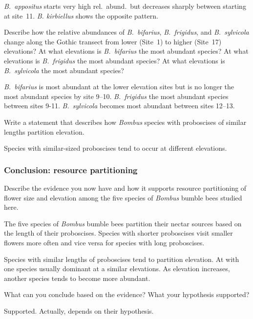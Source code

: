 \documentclass[12pt, hidelinks]{exam}
\newcommand*\AnswerBox[2]{%
    \parbox[t][#1]{0.92\textwidth}{%
    \begin{solution}#2\end{solution}}
    \vspace{\stretch{1}}
}
\newenvironment{AnswerPage}[1]
    {\begin{minipage}[t][#1]{0.92\textwidth}%
    \begin{solution}}
    {\end{solution}\end{minipage}
    \vspace{\stretch{1}}}
\begin{document}
\begin{questions}
\AnswerBox{3\baselineskip}{\textit{B.~appositus} starts very 
high rel.~abund.~but decreases sharply between starting at
site~11. \textit{B. kirbiellus} shows the opposite pattern.}

\question
Describe how the relative abundances of \textit{B.~bifarius},
\textit{B.~frigidus}, and \textit{B.~sylvicola} change along 
the Gothic transect from lower (Site~1) to higher (Site~17) elevations? At what elevations is \textit{B.~bifarius} the
most abundant species? At what elevations is \textit{B.~frigidus} 
the most abundant species? At what elevations is \textit{B.~sylvicola} 
the most abundant species?

\AnswerBox{4\baselineskip}{\textit{B.~bifarius} is most abundant
at the lower elevation sites but is no longer the most abundant 
species by site 9–10. \textit{B.~frigidus} the most abundant species
between sites 9-11. \textit{B.~sylvicola} becomes most abundant 
between sites 12–13.}


\question
Write a statement that describes how \textit{Bombus} species with
proboscises of similar lengths partition elevation.

\AnswerBox{2\baselineskip}{Species with similar-sized proboscises
tend to occur at different elevations.}

\subsubsection*{Conclusion: resource partitioning}

\question[Checkout]
Describe the evidence you now have and how it supports resource partitioning of flower size and elevation among the five species of 
\textit{Bombus} bumble bees studied here.


\begin{AnswerPage}{0.2\textheight}
The five species of \textit{Bombus} bumble bees partition their
nectar sources based on the length of their proboscises. Species
with shorter proboscises visit smaller flowers more often and 
vice versa for species with long proboscises.

Species with similar lengths of proboscises tend to partition
elevation. At with one species usually dominant at a similar 
elevations. As elevation increases, another species tends to become
more abundant.
\end{AnswerPage}

\question[Checkout]
What can you conclude based on the evidence? What your hypothesis supported?

\AnswerBox{0.1\textheight}{Supported. Actually, depends on their hypothesis.}

\end{questions}
\end{document}

